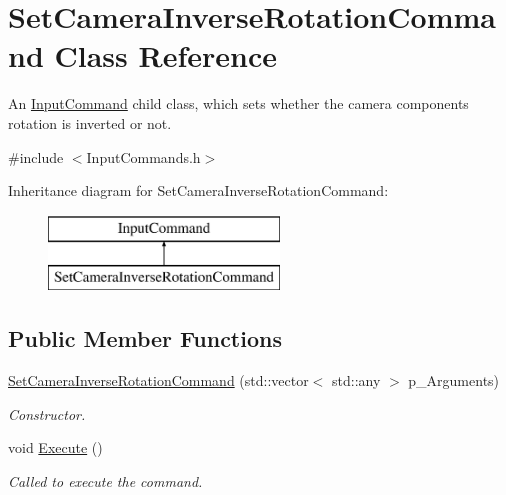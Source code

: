 \hypertarget{class_set_camera_inverse_rotation_command}{}\section{Set\+Camera\+Inverse\+Rotation\+Command Class Reference}
\label{class_set_camera_inverse_rotation_command}


An \mbox{\hyperlink{class_input_command}{Input\+Command}} child class, which sets whether the camera component\textquotesingle{}s rotation is inverted or not.  




{\ttfamily \#include $<$Input\+Commands.\+h$>$}

Inheritance diagram for Set\+Camera\+Inverse\+Rotation\+Command\+:\begin{figure}[H]
\begin{center}
\leavevmode
\includegraphics[height=2.000000cm]{class_set_camera_inverse_rotation_command}
\end{center}
\end{figure}
\subsection*{Public Member Functions}
\begin{DoxyCompactItemize}
\item 
\mbox{\hyperlink{class_set_camera_inverse_rotation_command_aa32d3f3738502f1eedc17459221e7918}{Set\+Camera\+Inverse\+Rotation\+Command}} (std\+::vector$<$ std\+::any $>$ p\+\_\+\+Arguments)
\begin{DoxyCompactList}\small\item\em Constructor. \end{DoxyCompactList}\item 
\mbox{\label{class_set_camera_inverse_rotation_command_a8d013b3f1e7c5ed4f563245ab16e52e4}} 
void \mbox{\hyperlink{class_set_camera_inverse_rotation_command_a8d013b3f1e7c5ed4f563245ab16e52e4}{Execute}} ()
\begin{DoxyCompactList}\small\item\em Called to execute the command. \end{DoxyCompactList}\end{DoxyCompactItemize}
